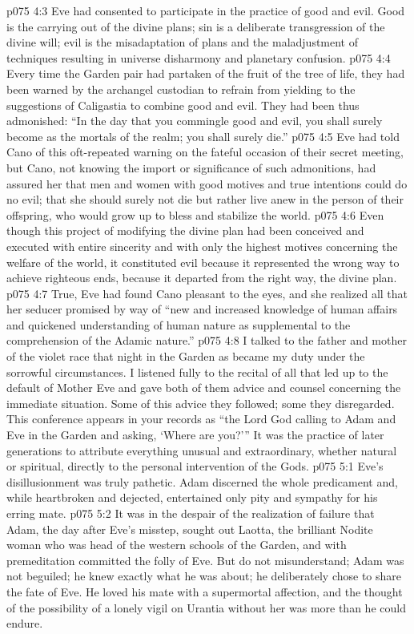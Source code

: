 \vs p075 4:3 Eve had consented to participate in the practice of good and evil. Good is the carrying out of the divine plans; sin is a deliberate transgression of the divine will; evil is the misadaptation of plans and the maladjustment of techniques resulting in universe disharmony and planetary confusion.
\vs p075 4:4 Every time the Garden pair had partaken of the fruit of the tree of life, they had been warned by the archangel custodian to refrain from yielding to the suggestions of Caligastia to combine good and evil. They had been thus admonished: “In the day that you commingle good and evil, you shall surely become as the mortals of the realm; you shall surely die.”
\vs p075 4:5 Eve had told Cano of this oft\hyp{}repeated warning on the fateful occasion of their secret meeting, but Cano, not knowing the import or significance of such admonitions, had assured her that men and women with good motives and true intentions could do no evil; that she should surely not die but rather live anew in the person of their offspring, who would grow up to bless and stabilize the world.
\vs p075 4:6 Even though this project of modifying the divine plan had been conceived and executed with entire sincerity and with only the highest motives concerning the welfare of the world, it constituted evil because it represented the wrong way to achieve righteous ends, because it departed from the right way, the divine plan.\plusone
\vs p075 4:7 True, Eve had found Cano pleasant to the eyes, and she realized all that her seducer promised by way of “new and increased knowledge of human affairs and quickened understanding of human nature as supplemental to the comprehension of the Adamic nature.”
\vs p075 4:8 I talked to the father and mother of the violet race that night in the Garden as became my duty under the sorrowful circumstances. I listened fully to the recital of all that led up to the default of Mother Eve and gave both of them advice and counsel concerning the immediate situation. Some of this advice they followed; some they disregarded. This conference appears in your records as “the Lord God calling to Adam and Eve in the Garden and asking, ‘Where are you?’” It was the practice of later generations to attribute everything unusual and extraordinary, whether natural or spiritual, directly to the personal intervention of the Gods.
\vs p075 5:1 Eve’s disillusionment was truly pathetic. Adam discerned the whole predicament and, while heartbroken and dejected, entertained only pity and sympathy for his erring mate.
\vs p075 5:2 It was in the despair of the realization of failure that Adam, the day after Eve’s misstep, sought out Laotta, the brilliant Nodite woman who was head of the western schools of the Garden, and with premeditation committed the folly of Eve. But do not misunderstand; Adam was not beguiled; he knew exactly what he was about; he deliberately chose to share the fate of Eve. He loved his mate with a supermortal affection, and the thought of the possibility of a lonely vigil on Urantia without her was more than he could endure.
